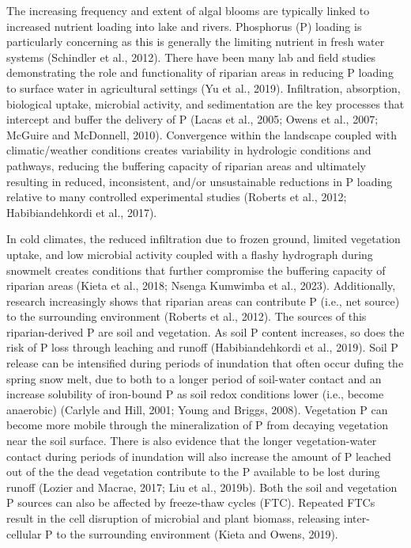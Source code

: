 \documentclass[
]{agujournal2019}
\begin{document}
The increasing frequency and extent of algal blooms are typically linked
to increased nutrient loading into lake and rivers. Phosphorus (P)
loading is particularly concerning as this is generally the limiting
nutrient in fresh water systems (Schindler et al., 2012). There have
been many lab and field studies demonstrating the role and functionality
of riparian areas in reducing P loading to surface water in agricultural
settings (Yu et al., 2019). Infiltration, absorption, biological uptake,
microbial activity, and sedimentation are the key processes that
intercept and buffer the delivery of P (Lacas et al., 2005; Owens et
al., 2007; McGuire and McDonnell, 2010). Convergence within the
landscape coupled with climatic/weather conditions creates variability
in hydrologic conditions and pathways, reducing the buffering capacity
of riparian areas and ultimately resulting in reduced, inconsistent,
and/or unsustainable reductions in P loading relative to many controlled
experimental studies (Roberts et al., 2012; Habibiandehkordi et al.,
2017).

In cold climates, the reduced infiltration due to frozen ground, limited
vegetation uptake, and low microbial activity coupled with a flashy
hydrograph during snowmelt creates conditions that further compromise
the buffering capacity of riparian areas (Kieta et al., 2018; Nsenga
Kumwimba et al., 2023). Additionally, research increasingly shows that
riparian areas can contribute P (i.e., net source) to the surrounding
environment (Roberts et al., 2012). The sources of this riparian-derived
P are soil and vegetation. As soil P content increases, so does the risk
of P loss through leaching and runoff (Habibiandehkordi et al., 2019).
Soil P release can be intensified during periods of inundation that
often occur dufing the spring snow melt, due to both to a longer period
of soil-water contact and an increase solubility of iron-bound P as soil
redox conditions lower (i.e., become anaerobic) (Carlyle and Hill, 2001;
Young and Briggs, 2008). Vegetation P can become more mobile through the
mineralization of P from decaying vegetation near the soil surface.
There is also evidence that the longer vegetation-water contact during
periods of inundation will also increase the amount of P leached out of
the the dead vegetation contribute to the P available to be lost during
runoff (Lozier and Macrae, 2017; Liu et al., 2019b). Both the soil and
vegetation P sources can also be affected by freeze-thaw cycles (FTC).
Repeated FTCs result in the cell disruption of microbial and plant
biomass, releasing inter-cellular P to the surrounding environment
(Kieta and Owens, 2019).
\end{document}
